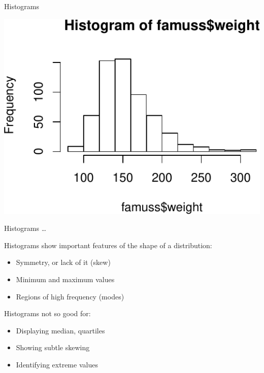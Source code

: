 \documentclass[
  ignorenonframetext,
]{beamer}
\newenvironment{Shaded}{\begin{snugshade}}{\end{snugshade}}
\newcommand{\KeywordTok}[1]{\textcolor[rgb]{0.13,0.29,0.53}{\textbf{#1}}}
\newcommand{\NormalTok}[1]{#1}
\newcommand{\OperatorTok}[1]{\textcolor[rgb]{0.81,0.36,0.00}{\textbf{#1}}}
\begin{document}
\begin{frame}[fragile]{Histograms}
\protect\hypertarget{histograms}{}

\scriptsize

\begin{Shaded}
\end{Shaded}

\begin{center}\includegraphics[width=1\linewidth]{001-exploring-data_files/figure-beamer/hist_weight-1} \end{center}

\normalsize

\end{frame}

\begin{frame}{Histograms \dots}
\protect\hypertarget{histograms-1}{}

Histograms show important features of the shape of a distribution:

\begin{itemize}
\item
  Symmetry, or lack of it (skew)
\item
  Minimum and maximum values
\item
  Regions of high frequency (modes)
\end{itemize}

Histograms not so good for:

\begin{itemize}
\item
  Displaying median, quartiles
\item
  Showing subtle skewing
\item
  Identifying extreme values
\end{itemize}

\end{frame}
\end{document}
